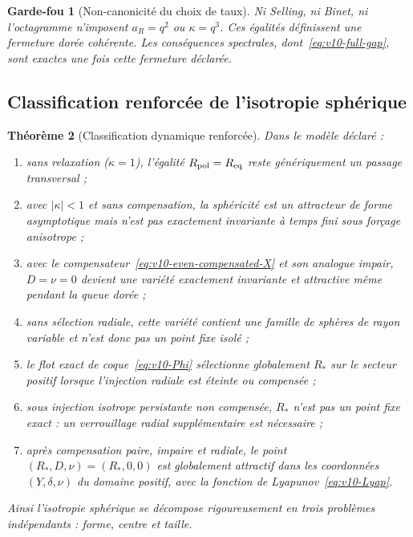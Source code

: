 \documentclass[11pt,a4paper]{article}
\newtheorem{theorem}{Théorème}[section]
\newtheorem{guardrail}[theorem]{Garde-fou}
\begin{document}
\begin{guardrail}[Non-canonicité du choix de taux]
Ni Selling, ni Binet, ni l'octagramme n'imposent $a_R=q^2$ ou $\kappa=q^3$. Ces égalités définissent une fermeture dorée cohérente. Les conséquences spectrales, dont~\eqref{eq:v10-full-gap}, sont exactes une fois cette fermeture déclarée.
\end{guardrail}

\subsection{Classification renforcée de l'isotropie sphérique}

\begin{theorem}[Classification dynamique renforcée]\label{thm:v10-strong-classification}
Dans le modèle déclaré :
\begin{enumerate}[label=\textup{(\roman*)}]
\item sans relaxation ($\kappa=1$), l'égalité $R_{\rm pol}=R_{\rm eq}$ reste génériquement un passage transversal ;
\item avec $|\kappa|<1$ et sans compensation, la sphéricité est un attracteur de forme asymptotique mais n'est pas exactement invariante à temps fini sous forçage anisotrope ;
\item avec le compensateur~\eqref{eq:v10-even-compensated-X} et son analogue impair, $D=\nu=0$ devient une variété exactement invariante et attractive même pendant la queue dorée ;
\item sans sélection radiale, cette variété contient une famille de sphères de rayon variable et n'est donc pas un point fixe isolé ;
\item le flot exact de coque~\eqref{eq:v10-Phi} sélectionne globalement $R_*$ sur le secteur positif lorsque l'injection radiale est éteinte ou compensée ;
\item sous injection isotrope persistante non compensée, $R_*$ n'est pas un point fixe exact : un verrouillage radial supplémentaire est nécessaire ;
\item après compensation paire, impaire et radiale, le point $(R_*,D,\nu)=(R_*,0,0)$ est globalement attractif dans les coordonnées $(Y,\delta,\nu)$ du domaine positif, avec la fonction de Lyapunov~\eqref{eq:v10-Lyap}.
\end{enumerate}
Ainsi l'isotropie sphérique se décompose rigoureusement en trois problèmes indépendants : forme, centre et taille.
\end{theorem}
\end{document}
